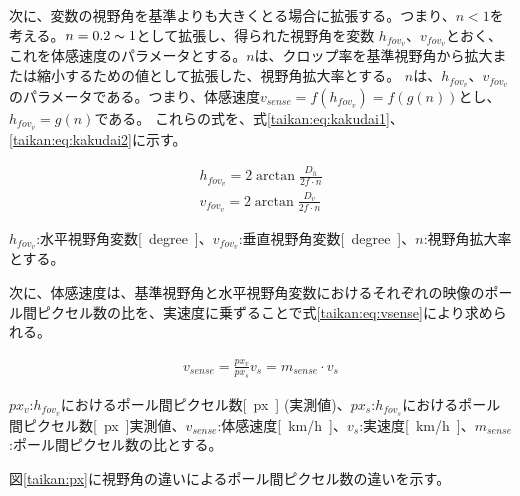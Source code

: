 次に、変数の視野角を基準よりも大きくとる場合に拡張する。つまり、$n<1$を考える。$n = 0.2 \thicksim 1$として拡張し、得られた視野角を変数
$h_{fov_v}$、$v_{fov_v}$とおく、これを体感速度のパラメータとする。$n$は、クロップ率を基準視野角から拡大または縮小するための値として拡張した、視野角拡大率とする。
$n$は、$h_{fov_v}$、$v_{fov_v}$のパラメータである。つまり、体感速度$v_{sense} = f(h_{fov_v}) = f(g(n))$とし、$h_{fov_v}=g(n)$である。
これらの式を、式\eqref{taikan:eq:kakudai1}、\eqref{taikan:eq:kakudai2}に示す。

\begin{align}
  h_{fov_v} = 2\arctan{\frac{D_h}{2f\cdot n}} \label{taikan:eq:kakudai1}\\
  v_{fov_v} = 2\arctan{\frac{D_v}{2f\cdot n}} \label{taikan:eq:kakudai2}
\end{align}

$h_{fov_v}$:水平視野角変数\si{[degree]}、$v_{fov_v}$:垂直視野角変数\si{[degree]}、$n$:視野角拡大率とする。

次に、体感速度は、基準視野角と水平視野角変数におけるそれぞれの映像のポール間ピクセル数の比を、実速度に乗ずることで式\eqref{taikan:eq:vsense}により求められる。

\begin{align}
  v_{sense} = \frac{px_v}{px_s}v_s = m_{sense}\cdot v_s \label{taikan:eq:vsense}
\end{align}

$px_v$:$h_{fov_v}$におけるポール間ピクセル数\si{[px]} (実測値)、$px_s$:$h_{fov_s}$におけるポール間ピクセル数\si{[px]}実測値、$v_{sense}$:体感速度\si{[km/h]}、$v_s$:実速度\si{[km/h]}、$m_{sense}$:ポール間ピクセル数の比とする。

図\ref{taikan:px}に視野角の違いによるポール間ピクセル数の違いを示す。

